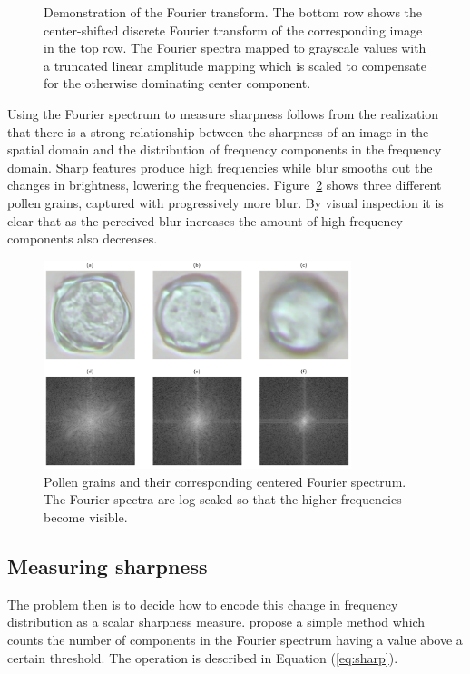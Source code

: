 \begin{figure}[htbp]
\begin{subfigure}[t]{0.2\textwidth}
  \end{subfigure}
  \caption[Demonstration of the Fourier transform]{
    Demonstration of the Fourier transform.
The bottom row shows the center-shifted discrete Fourier transform of the corresponding image in the top row.
The Fourier spectra mapped to grayscale values with a truncated linear amplitude mapping which is scaled to compensate for the otherwise dominating center component.}\label{fig:fourier-demo}
\end{figure}

Using the Fourier spectrum to measure sharpness follows from the realization that there is a strong relationship between the sharpness of an image in the spatial domain and the distribution of frequency components in the frequency domain.
Sharp features produce high frequencies while blur smooths out the changes in brightness, lowering the frequencies.
Figure~\ref{fig:fourier} shows three different pollen grains, captured with progressively more blur.
By visual inspection it is clear that as the perceived blur increases the amount of high frequency components also decreases.


\begin{figure}[htbp]
  \centering
  \includegraphics[width=0.8\textwidth]{figs/method/fourier/fourier.png}
  \caption[Fourier spectrum]{Pollen grains and their corresponding centered Fourier spectrum.
The Fourier spectra are log scaled so that the higher frequencies become visible.}\label{fig:fourier}
\end{figure}

\subsection{Measuring sharpness}
The problem then is to decide how to encode this change in frequency distribution as a scalar sharpness measure.
\citeauthor{de2013image} propose a simple method which counts the number of components in the Fourier spectrum having a value above a certain threshold.
The operation is described in Equation (\ref{eq:sharp}).


